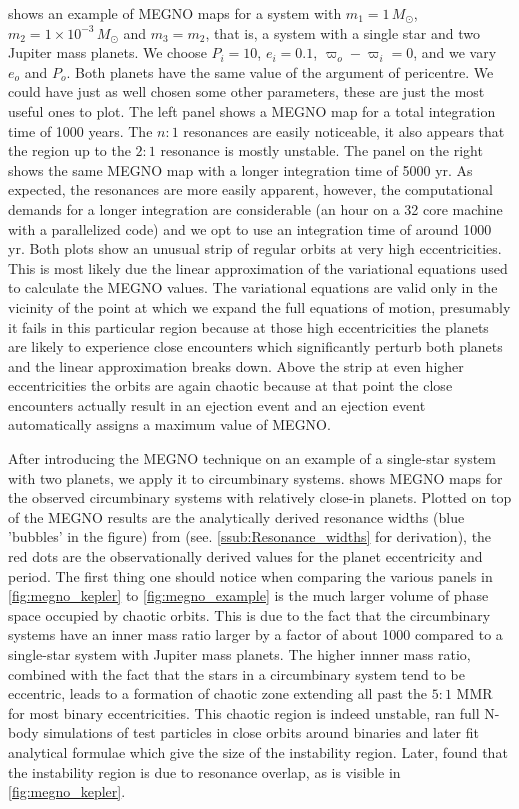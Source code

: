 \documentclass[twoside,openright,titlepage,numbers=noenddot,headinclude,%
                footinclude=true,cleardoublepage=empty,abstractoff, 
                BCOR=5mm,paper=a4,fontsize=11pt,%
                american,%
                ]{scrreprt}%
\begin{document}
 shows an example of MEGNO maps for a system
with $m_1=1\,M_\odot$, $m_2=1\times 10^{-3}\,M_\odot$ and $m_3=m_2$,
that is, a system with a single star and two Jupiter mass planets.
We choose $P_i=10$, $e_i=0.1$, $\varpi_o-\varpi_i=0$, and 
we vary $e_o$ and $P_o$.
Both planets have the same  value of the argument
of pericentre. We
could have just as well chosen some other parameters, these are just
the most useful ones to plot.  The left panel shows a MEGNO map for a total 
integration time of 1000 years. The $n:1$ 
resonances are easily noticeable, it also appears that the region
up to the $2:1$ resonance is mostly unstable. The panel on the right
shows the same MEGNO map with a longer integration time of 5000 yr.
As expected, the resonances are more easily apparent, however, the
computational demands for a longer integration are considerable (an 
hour on a 32 core machine with a parallelized code) and 
we opt to use an integration time of around 1000 yr. Both plots
show an unusual strip of regular orbits at very high eccentricities.
This is most likely due the linear approximation of the variational
equations used to calculate the MEGNO values. The variational equations
are valid only in the vicinity of the point at which we expand the
full equations of motion, presumably it fails in this particular 
region because at those high eccentricities the planets are likely
to experience close encounters which significantly perturb both 
planets and the linear approximation breaks down. Above the strip at
even higher eccentricities the orbits are again chaotic because at
that point the close encounters actually result in an ejection event
and an ejection event automatically assigns a maximum value of 
MEGNO.

After introducing the MEGNO technique on an example of a single-star 
system with two planets, we apply it to circumbinary systems.
 shows MEGNO maps for the observed circumbinary
systems with relatively close-in planets. Plotted on top of the 
MEGNO results are the analytically derived resonance widths (blue 'bubbles'
in the figure) from
\citet{Mardling2013} (see. \cref{ssub:Resonance_widths} for derivation), 
the red dots are the observationally derived values for the 
planet eccentricity and period. The first thing one should notice when
comparing the various panels in \cref{fig:megno_kepler} to 
\cref{fig:megno_example}  is the much larger volume of phase space 
occupied by chaotic orbits. This is due to the fact that the circumbinary
systems have an inner mass ratio larger by a factor of about 1000 compared
to a single-star system with Jupiter mass planets. The higher innner
mass ratio, combined with the fact that the stars in a circumbinary
system tend to be eccentric, leads to a formation of chaotic zone
extending all past the $5:1$ MMR for most binary eccentricities. 
This chaotic region is indeed unstable, \citet{Holman1999} ran full 
N-body simulations of test particles in close orbits around binaries
and later fit analytical formulae which give the size of the instability
region. Later, \citet{Mudryk2006} found that the instability region
is due to resonance overlap, as is visible in \cref{fig:megno_kepler}.
\end{document}
